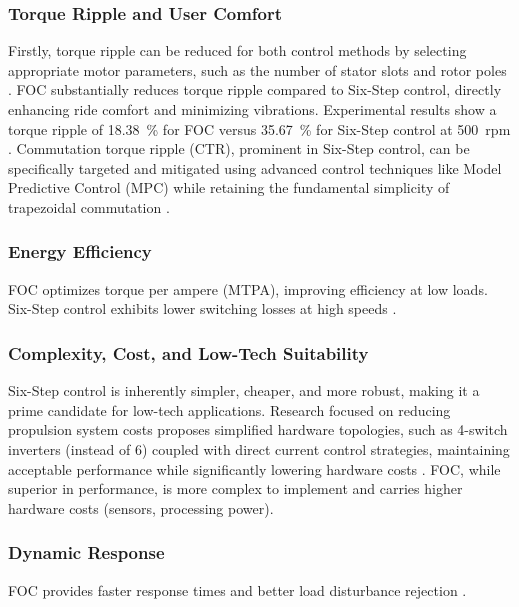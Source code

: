 \documentclass[conference]{IEEEtran}
\begin{document}
\subsubsection{Torque Ripple and User Comfort}
Firstly, torque ripple can be reduced for both control methods by selecting appropriate motor parameters, such as the 
number of stator slots and rotor poles \cite{gasc_conception_2004}.
FOC substantially reduces torque ripple compared to Six-Step control, directly enhancing ride comfort and minimizing 
vibrations. Experimental results show a torque ripple of \SI{18.38}{\percent} for FOC versus \SI{35.67}{\percent} for 
Six-Step control at 500~rpm \cite{jomsa-nga_torque_2024}. 
Commutation torque ripple (CTR), prominent in Six-Step control, can be specifically targeted and mitigated using 
advanced control techniques like Model Predictive Control (MPC) while retaining the fundamental simplicity of 
trapezoidal commutation \cite{mohammd_taher_new_2021}.

\subsubsection{Energy Efficiency}
FOC optimizes torque per ampere (MTPA), improving efficiency at low loads. Six-Step control exhibits lower switching 
losses at high speeds \cite{li_quantitative_2019}.

\subsubsection{Complexity, Cost, and Low-Tech Suitability}

Six-Step control is inherently simpler, cheaper, and more robust, making it a prime candidate for low-tech applications. 
Research focused on reducing propulsion system costs proposes simplified hardware topologies, such as 4-switch inverters 
(instead of 6) coupled with direct current control strategies, maintaining acceptable performance while significantly 
lowering hardware costs \cite{lee_advanced_2001}. FOC, while superior in performance, is more complex to implement and 
carries higher hardware costs (sensors, processing power).

\subsubsection{Dynamic Response}

FOC provides faster response times and better load disturbance rejection \cite{jomsa-nga_torque_2024}.
\end{document}
